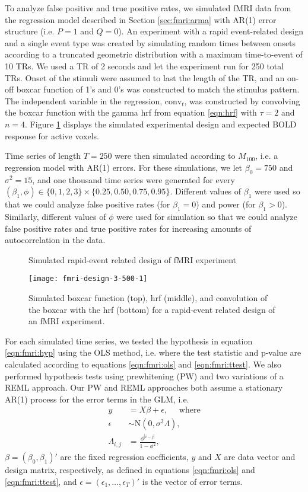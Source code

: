 To analyze false positive and true positive rates, we simulated fMRI data from the regression model described in Section \ref{sec:fmri:arma} with AR(1) error structure (i.e. $P = 1$ and $Q = 0$). An experiment with a rapid event-related design and a single event type was created by simulating random times between onsets according to a truncated geometric distribution with a maximum time-to-event of 10 TRs. We used a TR of 2 seconds and let the experiment run for 250 total TRs. Onset of the stimuli were assumed to last the length of the TR, and an on-off boxcar function of 1's and 0's was constructed to match the stimulus pattern. The independent variable in the regression, $\mbox{conv}_t$, was constructed by convolving the boxcar function with the gamma hrf from equation \eqref{eqn:hrf} with $\tau = 2$ and $n = 4$. Figure \ref{fig:fmri:design} displays the simulated experimental design and expected BOLD response for active voxels.

Time series of length $T = 250$ were then simulated according to $M_{100}$, i.e. a regression model with AR(1) errors. For these simulations, we let $\beta_0 = 750$ and $\sigma^2 = 15$, and one thousand time series were generated for every $(\beta_1,\phi) \in \{0,1,2,3\}\times\{0.25,0.50,0.75,0.95\}$. Different values of $\beta_1$ were used so that we could analyze false positive rates (for $\beta_1 = 0$) and power (for $\beta_1 > 0$). Similarly, different values of $\phi$ were used for simulation so that we could analyze false positive rates and true positive rates for increasing amounts of autocorrelation in the data.

\begin{figure}
\ssp
\centering
\caption{Simulated rapid-event related design of fMRI experiment} \label{fig:fmri:design}
\texttt{[image: fmri-design-3-500-1]}
\caption*{Simulated boxcar function (top), hrf (middle), and convolution of the boxcar with the hrf (bottom) for a rapid-event related design of an fMRI experiment.}
\end{figure}

For each simulated time series, we tested the hypothesis in equation \eqref{eqn:fmri:hyp} using the OLS method, i.e. where the test statistic and p-value are calculated according to equations \eqref{eqn:fmri:ols} and \eqref{eqn:fmri:ttest}. We also performed hypothesis tests using prewhitening (PW) and two variations of a REML approach. Our PW and REML approaches both assume a stationary AR(1) process for the error terms in the GLM, i.e.
\begin{align}
y &= X\beta + \epsilon, \quad \mbox{ where} \label{eqn:fmri:ar1} \\
\epsilon &\sim \mbox{N}(0,\sigma^2\Lambda), \nonumber \\
\Lambda_{i,j} &= \frac{\phi^{|i-j|}}{1 - \phi^2}, \nonumber
\end{align}
$\beta = (\beta_0,\beta_1)'$ are the fixed regression coefficients, $y$ and $X$ are data vector and design matrix, respectively, as defined in equations \eqref{eqn:fmri:ols} and \eqref{eqn:fmri:ttest}, and $\epsilon = (\epsilon_1,\ldots,\epsilon_T)'$ is the vector of error terms.

